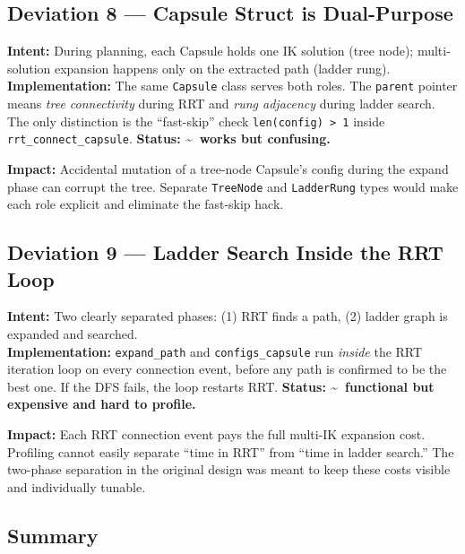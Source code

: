 \documentclass[11pt]{article}
\begin{document}
\subsection*{Deviation 8 — Capsule Struct is Dual-Purpose}

\textbf{Intent:} During planning, each Capsule holds one IK solution (tree node);
multi-solution expansion happens only on the extracted path (ladder rung).\\
\textbf{Implementation:} The same \texttt{Capsule} class serves both roles.
The \texttt{parent} pointer means \emph{tree connectivity} during RRT and
\emph{rung adjacency} during ladder search.  The only distinction is the
``fast-skip'' check \texttt{len(config) > 1} inside \texttt{rrt\_connect\_capsule}.
\textbf{Status: \textasciitilde~works but confusing.}

\noindent\textbf{Impact:} Accidental mutation of a tree-node Capsule's config during the
expand phase can corrupt the tree.  Separate \texttt{TreeNode} and
\texttt{LadderRung} types would make each role explicit and eliminate the fast-skip hack.

\subsection*{Deviation 9 — Ladder Search Inside the RRT Loop}

\textbf{Intent:} Two clearly separated phases: (1) RRT finds a path, (2) ladder graph
is expanded and searched.\\
\textbf{Implementation:} \texttt{expand\_path} and \texttt{configs\_capsule} run
\emph{inside} the RRT iteration loop on every connection event, before any path is
confirmed to be the best one.  If the DFS fails, the loop restarts RRT.
\textbf{Status: \textasciitilde~functional but expensive and hard to profile.}

\noindent\textbf{Impact:} Each RRT connection event pays the full multi-IK expansion
cost. Profiling cannot easily separate ``time in RRT'' from ``time in ladder search.''
The two-phase separation in the original design was meant to keep these costs visible
and individually tunable.

\subsection*{Summary}
\end{document}
